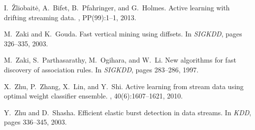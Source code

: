 \documentclass{sig-alternate}
\begin{document}
\begin{thebibliography}{10}
I.~\v{Z}liobait\.{e}, A.~Bifet, B.~Pfahringer, and G.~Holmes.
\newblock Active learning with drifting streaming data.
,
  PP(99):1--1, 2013.

M.~Zaki and K.~Gouda.
\newblock Fast vertical mining using diffsets.
\newblock In {\em SIGKDD}, pages 326--335, 2003.

M.~Zaki, S.~Parthasarathy, M.~Ogihara, and W.~Li.
\newblock New algorithms for fast discovery of association rules.
\newblock In {\em SIGKDD}, pages 283--286, 1997.

X.~Zhu, P.~Zhang, X.~Lin, and Y.~Shi.
\newblock Active learning from stream data using optimal weight classifier
  ensemble.
, 40(6):1607--1621, 2010.

Y.~Zhu and D.~Shasha.
\newblock Efficient elastic burst detection in data streams.
\newblock In {\em KDD}, pages 336--345, 2003.

\end{thebibliography}









%
%
\end{document}
